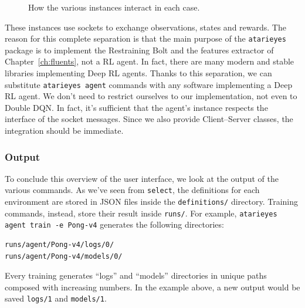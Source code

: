 \begin{figure}[p]
{
	}
	\caption{How the various instances interact in each case.}
	\label{fig:cmd-instances}
\end{figure}

These instances use sockets to exchange observations, states and rewards. The
reason for this complete separation is that the main purpose of the
\texttt{atarieyes} package is to implement the Restraining Bolt and the
features extractor of Chapter~\ref{ch:fluents}, not a RL agent. In fact, there
are many modern and stable libraries implementing Deep RL agents. Thanks to
this separation, we can substitute \texttt{atarieyes agent} commands with any
software implementing a Deep RL agent. We don't need to restrict ourselves to
our implementation, not even to Double DQN. In fact, it's sufficient that the
agent's instance respects the interface of the socket messages. Since we also
provide Client--Server classes, the integration should be immediate.


\subsubsection*{Output}

To conclude this overview of the user interface, we look at the output of the 
various commands. As we've seen from \texttt{select}, the definitions for each
environment are stored in JSON files inside the \texttt{definitions/}
directory. Training commands, instead, store their result inside
\texttt{runs/}. For example,
\verb|atarieyes agent train -e Pong-v4| 
generates the following directories:
\begin{verbatim}
runs/agent/Pong-v4/logs/0/
runs/agent/Pong-v4/models/0/
\end{verbatim}
Every training generates ``logs'' and ``models'' directories in
unique paths composed with increasing numbers. In the example above, a new
output would be saved \verb|logs/1| and \verb|models/1|.

